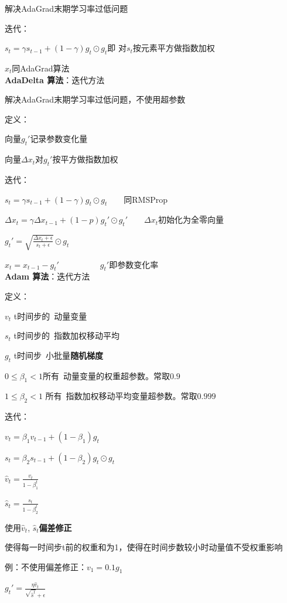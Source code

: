 \documentclass[UTF8]{ctexart}
\begin{document}
  解决AdaGrad末期学习率过低问题

  迭代：
  
  \quad $s_t = \gamma s_{t-1} + (1-\gamma)g_t \odot g_t$即 对$s_t$按元素平方做指数加权

  \quad $x_t$同AdaGrad算法\\
\textbf{AdaDelta 算法}：迭代方法

  解决AdaGrad末期学习率过低问题，不使用超参数

  定义：

  \quad 向量$g_t'$记录参数变化量

  \quad 向量$\varDelta x_t$对$g_t'$按平方做指数加权

  迭代：

  \quad $s_t = \gamma s_{t-1} + (1-\gamma)g_t \odot g_t$\ \ \ \ 同RMSProp

  \quad $\varDelta x_t = \gamma \varDelta x_{t-1} + (1-p)g_t' \odot g_t'$\ \ \ \ $\varDelta x_t$初始化为全零向量

  \quad $g_t' = \sqrt{\frac{\varDelta x_t + \epsilon }{s_t + \epsilon }} \odot g_t $

  \quad $x_t = x_{t-1} - g_t'$\ \ \ \ \ \ \ \ \ \ $g_t'$即参数变化率\\
\textbf{Adam 算法}：迭代方法

  定义：

  \quad $v_t$ t时间步的\ 动量变量

  \quad $s_t$ t时间步的\ 指数加权移动平均

  \quad $g_t$ t时间步\ 小批量\textbf{随机梯度}

  \quad $0\leq \beta_1<1$所有\ 动量变量的权重超参数。常取$0.9$
  
  \quad $1\leq \beta_2<1$ 所有\ 指数加权移动平均变量超参数。常取$0.999$

  迭代：

  \quad $v_t = \beta_1v_{t-1} + (1 -\beta_1)g_t$

  \quad $s_t = \beta_2 s_{t-1} + (1-\beta_2)g_t \odot g_t$

  \quad $\hat{v}_t = \frac{v_t}{1-\beta_1^t}$

  \quad $\hat{s}_t = \frac{s_t}{1-\beta_2^t}$

  \quad \quad 使用$\hat{v}_t$, $\hat{s}_t$\textbf{偏差修正}
  
  \quad \quad \quad 使得每一时间步t前的权重和为1，使得在时间步数较小时动量值不受权重影响

  \quad \quad \quad \quad 例：不使用偏差修正：$v_1 = 0.1g_1$

  \quad $g_t' = \frac{\eta \hat{v}_t}{\sqrt{\hat{s}^t} + \epsilon}$
\end{document}
